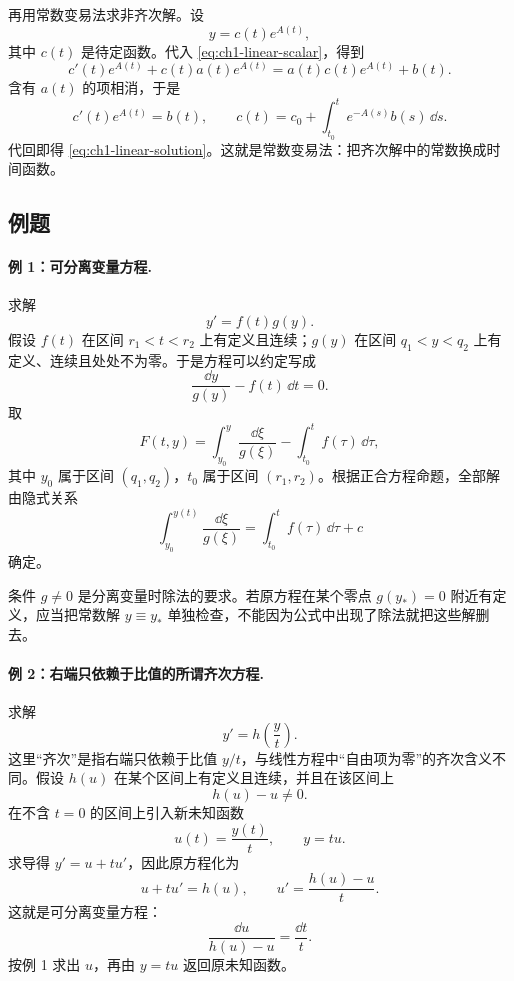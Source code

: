 再用常数变易法求非齐次解。设
\[
 y=c(t)e^{A(t)},
\]
其中 \(c(t)\) 是待定函数。代入 \eqref{eq:ch1-linear-scalar}，得到
\[
 c'(t)e^{A(t)}+c(t)a(t)e^{A(t)}
 =a(t)c(t)e^{A(t)}+b(t).
\]
含有 \(a(t)\) 的项相消，于是
\[
 c'(t)e^{A(t)}=b(t),
 \qquad
 c(t)=c_0+\int_{t_0}^{t}e^{-A(s)}b(s)\,\dd s.
\]
代回即得 \eqref{eq:ch1-linear-solution}。这就是常数变易法：把齐次解中的常数换成时间函数。

\subsection{例题}

\paragraph{例 1：可分离变量方程.}
求解
\begin{equation}
 y'=f(t)g(y).
 \label{eq:ch1-separable}
\end{equation}
假设 \(f(t)\) 在区间 \(r_1<t<r_2\) 上有定义且连续；\(g(y)\) 在区间 \(q_1<y<q_2\) 上有定义、连续且处处不为零。于是方程可以约定写成
\[
 \frac{\dd y}{g(y)}-f(t)\,\dd t=0.
\]
取
\[
 F(t,y)=\int_{y_0}^{y}\frac{\dd \xi}{g(\xi)}
 -\int_{t_0}^{t}f(\tau)\,\dd \tau,
\]
其中 \(y_0\) 属于区间 \((q_1,q_2)\)，\(t_0\) 属于区间 \((r_1,r_2)\)。根据正合方程命题，全部解由隐式关系
\begin{equation}
 \int_{y_0}^{y(t)}\frac{\dd \xi}{g(\xi)}
 =
 \int_{t_0}^{t}f(\tau)\,\dd \tau+c
 \label{eq:ch1-separable-integral}
\end{equation}
确定。

条件 \(g\neq0\) 是分离变量时除法的要求。若原方程在某个零点 \(g(y_*)=0\) 附近有定义，应当把常数解 \(y\equiv y_*\) 单独检查，不能因为公式中出现了除法就把这些解删去。

\paragraph{例 2：右端只依赖于比值的所谓齐次方程.}
求解
\begin{equation}
 y'=h\left(\frac{y}{t}\right).
 \label{eq:ch1-ratio-equation}
\end{equation}
这里“齐次”是指右端只依赖于比值 \(y/t\)，与线性方程中“自由项为零”的齐次含义不同。假设 \(h(u)\) 在某个区间上有定义且连续，并且在该区间上
\[
 h(u)-u\neq0.
\]
在不含 \(t=0\) 的区间上引入新未知函数
\[
 u(t)=\frac{y(t)}{t},
 \qquad y=tu.
\]
求导得 \(y'=u+tu'\)，因此原方程化为
\[
 u+tu'=h(u),
 \qquad
 u'=\frac{h(u)-u}{t}.
\]
这就是可分离变量方程：
\[
 \frac{\dd u}{h(u)-u}=\frac{\dd t}{t}.
\]
按例 1 求出 \(u\)，再由 \(y=tu\) 返回原未知函数。

